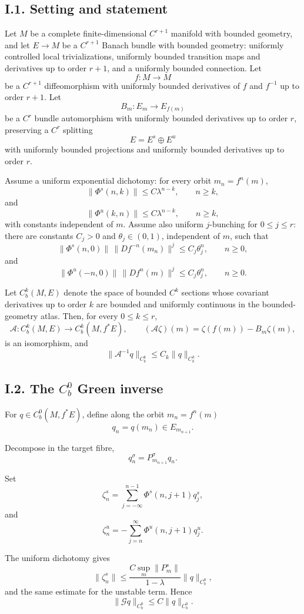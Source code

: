 \documentclass[12pt,a4paper]{article}
\theoremstyle{plain}
\numberwithin{equation}{section}
\numberwithin{theorem}{section}
\begin{document}
\subsection{I.1. Setting and statement}

Let $M$ be a complete finite-dimensional $C^{r+1}$ manifold with bounded geometry, and let $E\to M$ be a $C^{r+1}$ Banach bundle with bounded geometry: uniformly controlled local trivializations, uniformly bounded transition maps and derivatives up to order $r+1$, and a uniformly bounded connection. Let
\[
f:M\to M
\]
be a $C^{r+1}$ diffeomorphism with uniformly bounded derivatives of $f$ and $f^{-1}$ up to order $r+1$. Let
\[
B_m:E_m\to E_{f(m)}
\]
be a $C^r$ bundle automorphism with uniformly bounded derivatives up to order $r$, preserving a $C^r$ splitting
\[
E=E^s\oplus E^u
\]
with uniformly bounded projections and uniformly bounded derivatives up to order $r$.

Assume a uniform exponential dichotomy: for every orbit $m_n=f^n(m)$,
\[
\|\Phi^s(n,k)\|\le C\lambda^{n-k},
\qquad n\ge k,
\]
and
\[
\|\Phi^u(k,n)\|\le C\lambda^{n-k},
\qquad n\ge k,
\]
with constants independent of $m$. Assume also uniform $j$-bunching for $0\le j\le r$: there are constants $C_j>0$ and $\theta_j\in(0,1)$, independent of $m$, such that
\[
\|\Phi^s(n,0)\|\,\|Df^{-n}(m_n)\|^j
\le C_j\theta_j^n,
\qquad n\ge0,
\]
and
\[
\|\Phi^u(-n,0)\|\,\|Df^n(m)\|^j
\le C_j\theta_j^n,
\qquad n\ge0.
\]

Let $C_b^k(M,E)$ denote the space of bounded $C^k$ sections whose covariant derivatives up to order $k$ are bounded and uniformly continuous in the bounded-geometry atlas. Then, for every $0\le k\le r$,
\[
\mathcal A:C_b^k(M,E)\to C_b^k(M,f^*E),
\qquad
(\mathcal A\zeta)(m)=\zeta(f(m))-B_m\zeta(m),
\]
is an isomorphism, and
\[
\|\mathcal A^{-1}q\|_{C_b^k}
\le C_k\|q\|_{C_b^k}.
\]

\subsection{I.2. The $C_b^0$ Green inverse}

For $q\in C_b^0(M,f^*E)$, define along the orbit $m_n=f^n(m)$
\[
q_n=q(m_n)\in E_{m_{n+1}}.
\]

Decompose in the target fibre,
\[
q_n^\sigma=P_{m_{n+1}}^\sigma q_n.
\]

Set
\[
\zeta_n^s
=
\sum_{j=-\infty}^{n-1}\Phi^s(n,j+1)q_j^s,
\]
and
\[
\zeta_n^u
=
-
\sum_{j=n}^{\infty}\Phi^u(n,j+1)q_j^u.
\]

The uniform dichotomy gives
\[
\|\zeta_n^s\|
\le
\frac{C\sup_m\|P_m^s\|}{1-\lambda}
\|q\|_{C_b^0},
\]
and the same estimate for the unstable term. Hence
\[
\|\mathcal Gq\|_{C_b^0}
\le C\|q\|_{C_b^0}.
\]
\end{document}
